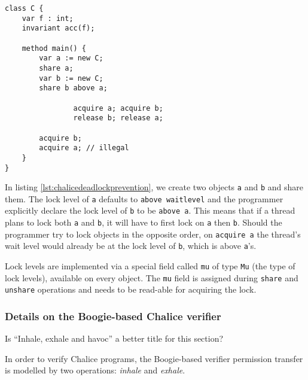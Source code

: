 \begin{lstlisting}[language=Chalice,float,caption={Example of deadlock-prevention},label={lst:chalicedeadlockprevention}]
class C {
    var f : int;
    invariant acc(f);

    method main() {
        var a := new C;
        share a;
        var b := new C;
        share b above a;

				acquire a; acquire b;
				release b; release a;

        acquire b;
        acquire a; // illegal
    }
}
\end{lstlisting}

In listing \ref{lst:chalicedeadlockprevention}, we create two objects \lstinline!a! and \lstinline!b! and share them. 
The lock level of \lstinline!a! defaults to \lstinline!above waitlevel! and the programmer explicitly declare the lock level of \lstinline!b! to be \lstinline!above a!.
This means that if a thread plans to lock both \lstinline!a! and \lstinline!b!, it will have to first lock on \lstinline!a! then \lstinline!b!.
Should the programmer try to lock objects in the opposite order, on \lstinline[language=Chalice]!acquire a! the thread's wait level would already be at the lock level of \lstinline!b!, which is above \lstinline!a!'s.

Lock levels are implemented via a special field called \lstinline!mu! of type \lstinline!Mu! (the type of lock levels), available on every object. 
The \lstinline!mu! field is assigned during \lstinline[language=Chalice]!share! and \lstinline[language=Chalice]!unshare! operations and needs to be read-able for acquiring the lock.

\subsubsection{Details on the Boogie-based Chalice verifier}
\begin{sketch}
Is ``Inhale, exhale and havoc'' a better title for this section?
\end{sketch}

In order to verify Chalice programs, the Boogie-based verifier permission transfer is modelled by two operations: \emph{inhale} and \emph{exhale}. 
